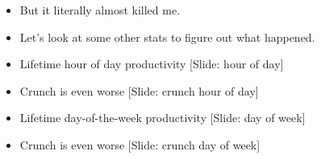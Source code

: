\documentclass[12pt]{article}
\begin{document}
{\begin{itemize}
\item But it literally almost killed me.

\item Let's look at some other stats to figure out what happened.

\item Lifetime hour of day productivity [Slide: hour of day]

\item Crunch is even worse [Slide: crunch hour of day]

\item Lifetime day-of-the-week productivity [Slide: day of week]

\item Crunch is even worse [Slide: crunch day of week]


\end{itemize}

}
\end{document}
